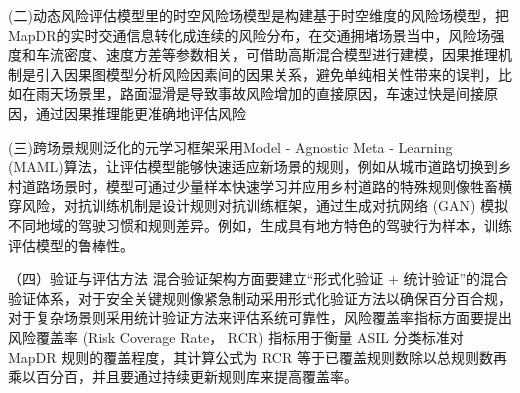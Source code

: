 (二)动态风险评估模型里的时空风险场模型是构建基于时空维度的风险场模型，把MapDR的实时交通信息转化成连续的风险分布，在交通拥堵场景当中，风险场强度和车流密度、速度方差等参数相关，可借助高斯混合模型进行建模，因果推理机制是引入因果图模型分析风险因素间的因果关系，避免单纯相关性带来的误判，比如在雨天场景里，路面湿滑是导致事故风险增加的直接原因，车速过快是间接原因，通过因果推理能更准确地评估风险 


(三)跨场景规则泛化的元学习框架采用Model - Agnostic Meta - Learning (MAML)算法，让评估模型能够快速适应新场景的规则，例如从城市道路切换到乡村道路场景时，模型可通过少量样本快速学习并应用乡村道路的特殊规则像牲畜横穿风险，对抗训练机制是设计规则对抗训练框架，通过生成对抗网络 (GAN) 模拟不同地域的驾驶习惯和规则差异\cite{zhang2014multi}。例如，生成具有地方特色的驾驶行为样本，训练评估模型的鲁棒性。


（四）验证与评估方法
混合验证架构方面要建立“形式化验证 + 统计验证”的混合验证体系，对于安全关键规则像紧急制动采用形式化验证方法以确保百分百合规，对于复杂场景则采用统计验证方法来评估系统可靠性，风险覆盖率指标方面要提出风险覆盖率 (Risk Coverage Rate， RCR) 指标用于衡量 ASIL 分类标准对 MapDR 规则的覆盖程度，其计算公式为 RCR 等于已覆盖规则数除以总规则数再乘以百分百，并且要通过持续更新规则库来提高覆盖率。


